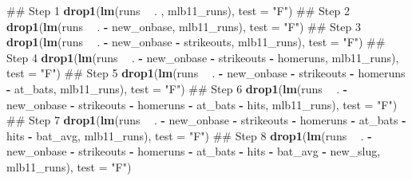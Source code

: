 \documentclass[]{book}
\newenvironment{Shaded}{\begin{snugshade}}{\end{snugshade}}
\newcommand{\DataTypeTok}[1]{\textcolor[rgb]{0.13,0.29,0.53}{#1}}
\newcommand{\KeywordTok}[1]{\textcolor[rgb]{0.13,0.29,0.53}{\textbf{#1}}}
\newcommand{\NormalTok}[1]{#1}
\newcommand{\OperatorTok}[1]{\textcolor[rgb]{0.81,0.36,0.00}{\textbf{#1}}}
\newcommand{\StringTok}[1]{\textcolor[rgb]{0.31,0.60,0.02}{#1}}
\theoremstyle{definition}
\theoremstyle{definition}
\theoremstyle{definition}
\theoremstyle{remark}
\begin{document}
\begin{Shaded}
\begin{Highlighting}[]
\NormalTok{## Step 1}
\KeywordTok{drop1}\NormalTok{(}\KeywordTok{lm}\NormalTok{(runs }\OperatorTok{~}\StringTok{ }\NormalTok{. , mlb11_runs), }\DataTypeTok{test =} \StringTok{"F"}\NormalTok{)}
\NormalTok{## Step 2}
\KeywordTok{drop1}\NormalTok{(}\KeywordTok{lm}\NormalTok{(runs }\OperatorTok{~}\StringTok{ }\NormalTok{. }\OperatorTok{-}\StringTok{ }\NormalTok{new_onbase, mlb11_runs), }\DataTypeTok{test =} \StringTok{"F"}\NormalTok{)}
\NormalTok{## Step 3}
\KeywordTok{drop1}\NormalTok{(}\KeywordTok{lm}\NormalTok{(runs }\OperatorTok{~}\StringTok{ }\NormalTok{. }\OperatorTok{-}\StringTok{ }\NormalTok{new_onbase }\OperatorTok{-}\StringTok{ }\NormalTok{strikeouts, mlb11_runs), }\DataTypeTok{test =} \StringTok{"F"}\NormalTok{)}
\NormalTok{## Step 4}
\KeywordTok{drop1}\NormalTok{(}\KeywordTok{lm}\NormalTok{(runs }\OperatorTok{~}\StringTok{ }\NormalTok{. }\OperatorTok{-}\StringTok{ }\NormalTok{new_onbase }\OperatorTok{-}\StringTok{ }\NormalTok{strikeouts }\OperatorTok{-}\StringTok{ }\NormalTok{homeruns, mlb11_runs), }\DataTypeTok{test =} \StringTok{"F"}\NormalTok{)}
\NormalTok{## Step 5}
\KeywordTok{drop1}\NormalTok{(}\KeywordTok{lm}\NormalTok{(runs }\OperatorTok{~}\StringTok{ }\NormalTok{. }\OperatorTok{-}\StringTok{ }\NormalTok{new_onbase }\OperatorTok{-}\StringTok{ }\NormalTok{strikeouts }\OperatorTok{-}\StringTok{ }\NormalTok{homeruns }\OperatorTok{-}\StringTok{ }\NormalTok{at_bats, mlb11_runs), }\DataTypeTok{test =} \StringTok{"F"}\NormalTok{)}
\NormalTok{## Step 6}
\KeywordTok{drop1}\NormalTok{(}\KeywordTok{lm}\NormalTok{(runs }\OperatorTok{~}\StringTok{ }\NormalTok{. }\OperatorTok{-}\StringTok{ }\NormalTok{new_onbase }\OperatorTok{-}\StringTok{ }\NormalTok{strikeouts }\OperatorTok{-}\StringTok{ }\NormalTok{homeruns }\OperatorTok{-}\StringTok{ }\NormalTok{at_bats }\OperatorTok{-}\StringTok{ }\NormalTok{hits, mlb11_runs), }\DataTypeTok{test =} \StringTok{"F"}\NormalTok{)}
\NormalTok{## Step 7}
\KeywordTok{drop1}\NormalTok{(}\KeywordTok{lm}\NormalTok{(runs }\OperatorTok{~}\StringTok{ }\NormalTok{. }\OperatorTok{-}\StringTok{ }\NormalTok{new_onbase }\OperatorTok{-}\StringTok{ }\NormalTok{strikeouts }\OperatorTok{-}\StringTok{ }\NormalTok{homeruns }\OperatorTok{-}\StringTok{ }\NormalTok{at_bats }\OperatorTok{-}\StringTok{ }\NormalTok{hits  }\OperatorTok{-}\StringTok{ }\NormalTok{bat_avg, mlb11_runs), }\DataTypeTok{test =} \StringTok{"F"}\NormalTok{)}
\NormalTok{## Step 8}
\KeywordTok{drop1}\NormalTok{(}\KeywordTok{lm}\NormalTok{(runs }\OperatorTok{~}\StringTok{ }\NormalTok{. }\OperatorTok{-}\StringTok{ }\NormalTok{new_onbase }\OperatorTok{-}\StringTok{ }\NormalTok{strikeouts }\OperatorTok{-}\StringTok{ }\NormalTok{homeruns }\OperatorTok{-}\StringTok{ }\NormalTok{at_bats }\OperatorTok{-}\StringTok{ }\NormalTok{hits  }\OperatorTok{-}\StringTok{ }\NormalTok{bat_avg }\OperatorTok{-}\StringTok{ }\NormalTok{new_slug, mlb11_runs), }\DataTypeTok{test =} \StringTok{"F"}\NormalTok{)}
\end{Highlighting}
\end{Shaded}
\end{document}
